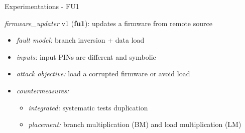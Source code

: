 \begin{frame}{Experimentations - FU1} 
    \begin{small}
        \textit{firmware\_updater} v1 (\textbf{fu1}): updates a firmware from remote source
        \begin{itemize}
            \item \textit{fault model:} branch inversion + data load
            \item \textit{inputs:} input PINs are different and symbolic
            \item \textit{attack objective:} load a corrupted firmware or avoid load
            \item \textit{countermeasures:}
            \begin{itemize}
                \item \textit{integrated:} systematic tests duplication
                \item \textit{placement:} branch multiplication (BM) and load multiplication (LM)
            \end{itemize}
        \end{itemize}
    \end{small}
    

\end{frame}
